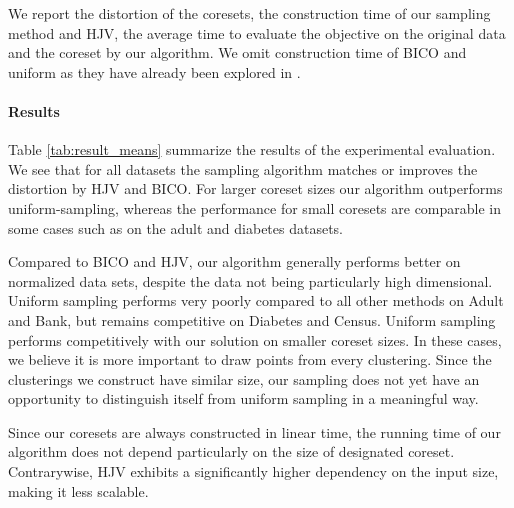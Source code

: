 We report the distortion of the coresets, the construction time of our sampling method and HJV, the average time to evaluate the objective on the original data and the coreset by our algorithm. We omit construction time of BICO and uniform as they have already been explored in \cite{HuangJV19}.  
\paragraph{Results}
Table \ref{tab:result_means} summarize the results of the experimental evaluation. We see that for all datasets the sampling algorithm matches or improves the distortion by HJV and BICO. For larger coreset sizes our algorithm outperforms uniform-sampling, whereas the performance for small coresets are comparable in some cases such as on the adult and diabetes datasets. 

Compared to BICO and HJV, our algorithm generally performs better on normalized data sets, despite the data not being particularly high dimensional. Uniform sampling performs very poorly compared to all other methods on Adult and Bank, but remains competitive on Diabetes and Census.
Uniform sampling performs competitively with our solution on smaller coreset sizes. In these cases, we believe it is more important to draw points from every clustering. Since the clusterings we construct have similar size, our sampling does not yet have an opportunity to distinguish itself from uniform sampling in a meaningful way. 

Since our coresets are always constructed in linear time, the running time of our algorithm does not depend particularly on the size of designated coreset. Contrarywise, HJV exhibits a significantly higher dependency on the input size, making it less scalable.



